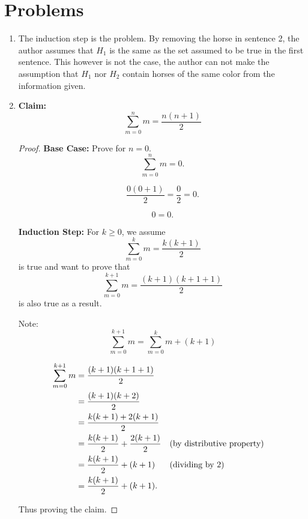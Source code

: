 \documentclass{article}
\begin{document}
\section{Problems}
\begin{enumerate}
    \item %
        The induction step is the problem. By removing the horse in sentence 2, the author assumes that $H_1$ is the same as the set assumed to be true in the first sentence. This however is not the case, the author can not make the assumption that $H_1$ nor $H_2$ contain horses of the same color from the information given.
    \item %
        \textbf{Claim:}
        \[
            \sum_{m=0}^n m = \frac{n(n+1)}{2}
        \]
        \begin{proof}
            \textbf{Base Case:} Prove for $n = 0$.
            \[
                \sum_{m=0}^n m = 0.
            \]

            \[
                \frac{0(0+1)}{2} = \frac{0}{2} = 0.
            \]

            \[
                0 = 0.
            \]

            \textbf{Induction Step:} For $k \geq 0$,  we assume
            \[
                \sum_{m=0}^k m = \frac{k(k+1)}{2}
            \]
            is true and want to prove that
            \[
                \sum_{m=0}^{k+1} m = \frac{(k+1)(k+1+1)}{2}
            \]
            is also true as a result.

            Note:
            \[
                \sum_{m=0}^{k+1} m = \sum_{m=0}^k m + (k + 1)
            \]

            \begin{align*}
                \sum_{m=0}^{k+1} m &= \frac{(k+1)(k+1+1)}{2} \\
                &= \frac{(k+1)(k+2)}{2} \\
                &= \frac{k(k+1) + 2(k+1)}{2} \\
                &= \frac{k(k+1)}{2} + \frac{2(k+1)}{2} &&\text{(by distributive property)}\\
                &= \frac{k(k+1)}{2} + (k+1) &&\text{(dividing by 2)}\\
                &= \frac{k(k+1)}{2} + (k+1).
                &&\qedhere
            \end{align*}

            Thus proving the claim.
        \end{proof}
\end{enumerate}
\end{document}
